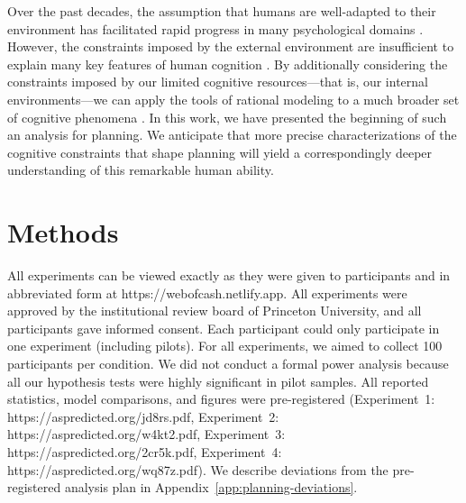 
Over the past decades, the assumption that humans are well-adapted to their environment \citep{marr1982vision,anderson1990adaptive} has facilitated rapid progress in many psychological domains \citep{oaksford1994rational,gureckis2012selfdirected,tenenbaum2001generalization,anderson1991adaptive,ashby1995categorization,savage1954foundations}. However, the constraints imposed by the external environment are insufficient to explain many key features of human cognition \citep{rahnev2018suboptimality,lieder2020resourcerational}. By additionally considering the constraints imposed by our limited cognitive resources---that is, our internal environments---we can apply the tools of rational modeling to a much broader set of cognitive phenomena \citep{griffiths2015rational,lieder2020resourcerational}. In this work, we have presented the beginning of such an analysis for planning. We anticipate that more precise characterizations of the cognitive constraints that shape planning will yield a correspondingly deeper understanding of this remarkable human ability.


\section{Methods}\label{sec:planning-methods}

All experiments can be viewed exactly as they were given to participants and in abbreviated form at https://webofcash.netlify.app. All experiments were approved by the institutional review board of Princeton University, and all participants gave informed consent. Each participant could only participate in one experiment (including pilots). For all experiments, we aimed to collect 100 participants per condition. We did not conduct a formal power analysis because all our hypothesis tests were highly significant in pilot samples. All reported statistics, model comparisons, and figures were pre-registered
(Experiment~1: https://aspredicted.org/jd8rs.pdf,
Experiment~2: https://aspredicted.org/w4kt2.pdf,
Experiment~3: https://aspredicted.org/2cr5k.pdf,
Experiment~4: https://aspredicted.org/wq87z.pdf). We describe deviations from the pre-registered analysis plan in Appendix~\ref{app:planning-deviations}.


